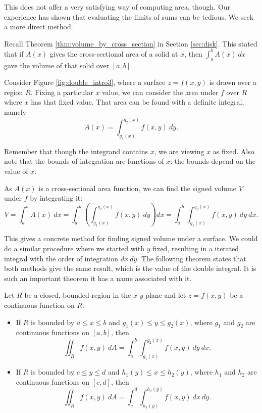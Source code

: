 This does not offer a very satisfying way of computing area, though. Our experience has shown that evaluating the limits of sums can be tedious. We seek a more direct method.

Recall Theorem \ref{thm:volume_by_cross_section} in Section \ref{sec:disk}. This stated that if $A(x)$ gives the cross-sectional area of a solid at $x$, then $\int_a^b A(x)\ dx$ gave the volume of that solid over $[a,b]$. 

Consider Figure \ref{fig:double_intro3}, where a surface $z=f(x,y)$ is drawn over a region $R$. Fixing a particular $x$ value, we can consider the area under $f$ over $R$ where $x$ has that fixed value. That area can be found with a definite integral, namely $$ A(x)=\int_{g_1(x)}^{g_2(x)} f(x,y)\ dy.$$

Remember that though the integrand contains $x$, we are viewing $x$ as fixed. Also note that the bounds of integration are functions of $x$: the bounds depend on the value of $x$. 


As $A(x)$ is a cross-sectional area function, we can find the signed volume $V$ under $f$ by integrating it:
$$V = \int_a^b A(x)\ dx = \int_a^b\left(\int_{g_1(x)}^{g_2(x)} f(x,y)\ dy\right)dx = \int_a^b\int_{g_1(x)}^{g_2(x)} f(x,y)\ dy\ dx.$$

This gives a concrete method for finding signed volume under a surface. We could do a similar procedure where we started with $y$ fixed, resulting in a iterated integral with the order of integration $dx\ dy$. The following theorem states that both methods give the same result, which is the value of the double integral. It is such an important theorem it has a name associated with it.

{Let $R$ be a closed, bounded region in the $x$-$y$ plane and let $z=f(x,y)$ be a continuous function on $R$.
\begin{itemize}
	\item If $R$ is bounded by $a\leq x\leq b$ and $g_1(x)\leq y\leq g_2(x)$, where $g_1$ and $g_2$ are continuous functions on $[a,b]$, then
	$$\iint_R f(x,y)\ dA = \int_a^b\int_{g_1(x)}^{g_2(x)} f(x,y)\ dy\ dx.$$
	
	\item If $R$ is bounded by $c\leq y\leq d$ and $h_1(y)\leq x\leq h_2(y)$, where $h_1$ and $h_2$ are continuous functions on $[c,d]$, then
	$$\iint_R f(x,y)\ dA = \int_c^d\int_{h_1(y)}^{h_2(y)} f(x,y)\ dx\ dy.$$
\end{itemize}
}

